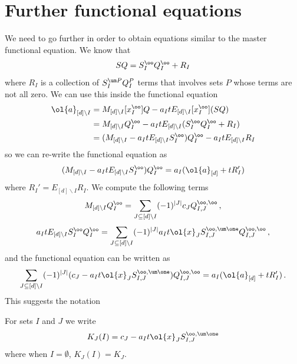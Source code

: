 \section{Further functional equations}
We need to go further in order to obtain equations similar to the master functional equation. We know that
\begin{align}
	[x_I^\oo] SQ  = S_I^\oo Q_I^\oo + R_I
\end{align}
where $R_I$ is a collection of $S_I^{\um P} Q_I^{P}$ terms that involves sets $P$ whose terms are not all zero. We can use this inside the functional equation
\begin{align}\begin{split}
	\ol{a}_{[d]\backslash I} &= M_{[d]\backslash I}[x_I^\oo]Q- a_{I}t E_{[d]\backslash I}[x_I^\oo](SQ)\\
	& = M_{[d]\backslash I}Q_I^\oo- a_{I}t E_{[d]\backslash I}(S_I^\oo Q_I^\oo + R_I)\\
	& = (M_{[d]\backslash I} - a_{I}t E_{[d]\backslash I}S_I^\oo)Q_I^\oo  -a_{I}t E_{[d]\backslash I}R_I
\end{split}\end{align}
so we can re-write the functional equation as
\begin{align}
	(M_{[d]\backslash I} - a_{I}t E_{[d]\backslash I}S_I^\oo)Q_I^\oo = a_I(\ol{a}_{[d]}+t R_I')
\end{align}
where $R_I' =  E_{[d]\backslash I}R_I$. We compute the following terms
\begin{align}
	M_{[d]\backslash I}Q_I^\oo = \sum_{J \subseteq [d]\backslash I} (-1)^{|J|}c_J Q_{I,J}^{\oo,\oo}\,,
\end{align}
\begin{align}
	a_I t E_{[d]\backslash I}S_I^\oo Q_I^\oo = \sum_{J \subseteq [d]\backslash I}  (-1)^{|J|}a_I t\ol{x}_J S_{I,J}^{\oo,\um \one}Q_{I,J}^{\oo,\oo}\,,
\end{align}
and the functional equation can be written as
\begin{align}
	\sum_{J \subseteq [d]\backslash I}  (-1)^{|J|}(c_J - a_I t\ol{x}_J S_{I,J}^{\oo,\um \one})Q_{I,J}^{\oo,\oo} = a_I(\ol{a}_{[d]}+t R_I')\,.
\end{align}
This suggests the notation
\begin{definition} For sets $I$ and $J$ we write
\begin{align}
	K_J(I) = c_J - a_I t\ol{x}_J S_{I,J}^{\oo,\um\one}
\end{align}
where when $I = \emptyset$, $K_J(I) = K_J$.
\end{definition}
